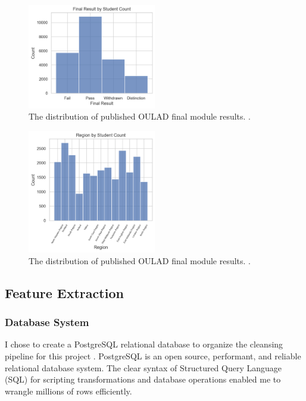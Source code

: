 \documentclass{article}
\begin{document}
            \begin{figure}
                \centering
                \includegraphics[width=0.5\textwidth]{final_result_by_student}
                \caption{The distribution of published OULAD final module results. \cite{oulad}.}
                \label{fig:final_result_by_student}
            \end{figure}
            \begin{figure}
                \centering
                \includegraphics[width=0.5\textwidth]{region_by_student}
                \caption{The distribution of published OULAD final module results. \cite{oulad}.}
                \label{fig:region_by_student}
            \end{figure}
        
        \subsection{Feature Extraction}
        
            \subsubsection{Database System}
                I chose to create a PostgreSQL relational database to organize the cleansing pipeline for this project \cite{postgresql}.
                PostgreSQL is an open source, performant, and reliable relational database system. 
                The clear syntax of Structured Query Language (SQL) for scripting transformations 
                and database operations enabled me to wrangle millions of rows efficiently.
      
\end{document}
